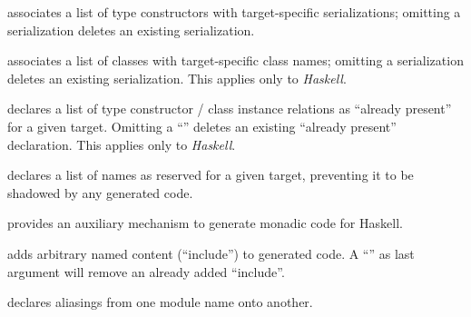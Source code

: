 \begin{isabellebody}
\begin{isamarkuptext}
\begin{description}
  \item \hyperlink{command.HOL.code-type}{\mbox{}} associates a list of type
  constructors with target-specific serializations; omitting a
  serialization deletes an existing serialization.

  \item \hyperlink{command.HOL.code-class}{\mbox{}} associates a list of classes
  with target-specific class names; omitting a serialization deletes
  an existing serialization.  This applies only to \emph{Haskell}.

  \item \hyperlink{command.HOL.code-instance}{\mbox{}} declares a list of type
  constructor / class instance relations as ``already present'' for a
  given target.  Omitting a ``'' deletes an existing
  ``already present'' declaration.  This applies only to
  \emph{Haskell}.

  \item \hyperlink{command.HOL.code-reserved}{\mbox{}} declares a list of names as
  reserved for a given target, preventing it to be shadowed by any
  generated code.

  \item \hyperlink{command.HOL.code-monad}{\mbox{}} provides an auxiliary mechanism
  to generate monadic code for Haskell.

  \item \hyperlink{command.HOL.code-include}{\mbox{}} adds arbitrary named content
  (``include'') to generated code.  A ``'' as last argument
  will remove an already added ``include''.

  \item \hyperlink{command.HOL.code-modulename}{\mbox{}} declares aliasings from one
  module name onto another.


\end{description}
\end{isamarkuptext}
\end{isabellebody}
